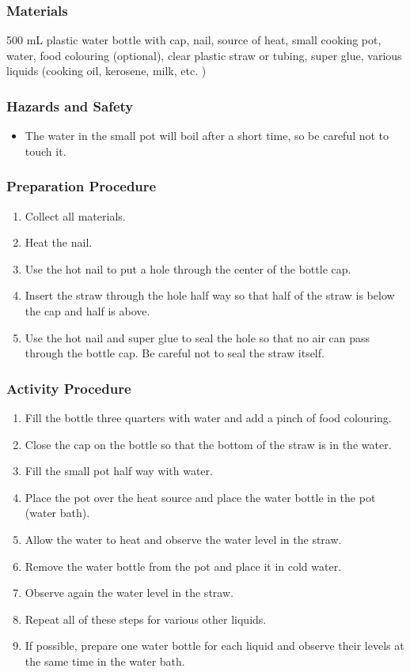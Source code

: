 \subsubsection*{Materials}
500 mL plastic water bottle with cap, nail, source of heat, small cooking pot, water, food colouring (optional), clear plastic straw or tubing, super glue, various liquids (cooking oil, kerosene, milk, etc.  )

\subsubsection*{Hazards and Safety}
\begin{itemize}
\item{The water in the small pot will boil after a short time, so be careful not to touch it.} 
\end{itemize}

\subsubsection*{Preparation Procedure}
\begin{enumerate}
\item{Collect all materials.} 
\item{Heat the nail.} 
\item{Use the hot nail to put a hole through the center of the bottle cap.} 
\item{Insert the straw through the hole half way so that half of the straw is below the cap and half is above.} 
\item{Use the hot nail and super glue to seal the hole so that no air can pass through the bottle cap. Be careful not to seal the straw itself.} 
\end{enumerate}

\subsubsection*{Activity Procedure}
\begin{enumerate}
\item{Fill the bottle three quarters with water and add a pinch of food colouring.} 
\item{Close the cap on the bottle so that the bottom of the straw is in the water.} 
\item{Fill the small pot half way with water.} 
\item{Place the pot over the heat source and place the water bottle in the pot (water bath).} 
\item{Allow the water to heat and observe the water level in the straw.} 
\item{Remove the water bottle from the pot and place it in cold water.} 
\item{Observe again the water level in the straw.} 
\item{Repeat all of these steps for various other liquids.} 
\item{If possible, prepare one water bottle for each liquid and observe their levels at the same time in the water bath.} 
\end{enumerate}

